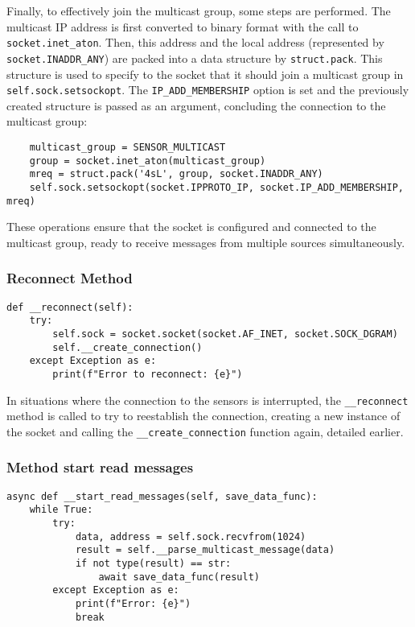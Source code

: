 Finally, to effectively join the multicast group, some steps are performed. The multicast IP address is first converted to binary format with the call to \texttt{socket.inet\_aton}. Then, this address and the local address (represented by \texttt{socket.INADDR\_ANY}) are packed into a data structure by \texttt{struct.pack}. This structure is used to specify to the socket that it should join a multicast group in \texttt{self.sock.setsockopt}. The \texttt{IP\_ADD\_MEMBERSHIP} option is set and the previously created structure is passed as an argument, concluding the connection to the multicast group:

\begin{verbatim}
    multicast_group = SENSOR_MULTICAST
    group = socket.inet_aton(multicast_group)
    mreq = struct.pack('4sL', group, socket.INADDR_ANY)
    self.sock.setsockopt(socket.IPPROTO_IP, socket.IP_ADD_MEMBERSHIP, mreq)
\end{verbatim}

These operations ensure that the socket is configured and connected to the multicast group, ready to receive messages from multiple sources simultaneously.


\subsubsection[Reconnect Method]{Reconnect Method}
\begin{verbatim}
def __reconnect(self):
    try:
        self.sock = socket.socket(socket.AF_INET, socket.SOCK_DGRAM)
        self.__create_connection()
    except Exception as e:
        print(f"Error to reconnect: {e}")
\end{verbatim}

In situations where the connection to the sensors is interrupted, the \texttt{\_\_reconnect} method is called to try to reestablish the connection, creating a new instance of the socket and calling the \texttt{\_\_create\_connection} function again, detailed earlier.

\subsubsection[Method start read messages]{Method start read messages}

\begin{verbatim}
async def __start_read_messages(self, save_data_func):
    while True:
        try:
            data, address = self.sock.recvfrom(1024)
            result = self.__parse_multicast_message(data)
            if not type(result) == str:
                await save_data_func(result)
        except Exception as e:
            print(f"Error: {e}")
            break
\end{verbatim}

